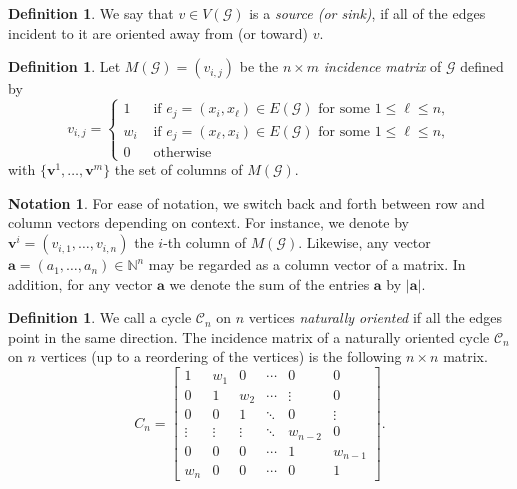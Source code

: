 \documentclass [12pt,a4paper,reqno]{amsart}
\theoremstyle{plain}
\theoremstyle{definition}
\newtheorem{Assumptions and Discussion}[Theorem]{Assumptions and Discussion}
\newtheorem{Definition}[Theorem]{Definition}
\newtheorem{Notation}[Theorem]{Notation}
\theoremstyle{remark}
\def\NN{{\mathbb N}}
\newcommand\bfa{\mathbf{a}}
\newcommand\bfv{\mathbf{v}}
\newcommand\calC{\mathcal{C}}
\newcommand\calG{\mathcal{G}}
\begin{document}
\begin{Definition}
We say that $v\in V(\calG)$ is a \emph{source (or sink)}, if all of the edges incident to it are oriented away from (or toward) $v$.  
\end{Definition}

\begin{Definition}
Let $M(\calG)=(v_{i,j})$ be the $n\times m$ \emph{incidence matrix} of $\calG$ defined by 
\[
    v_{i,j}=
    \begin{cases}
        1 & \text{ if $e_j=(x_i,x_\ell)\in E(\calG)$ for some $1\leq \ell\leq n$},\\
        w_i & \text{ if $e_j=(x_\ell,x_i)\in E(\calG)$ for some $1\leq \ell\leq n$},\\
        0 & \text{ otherwise}
    \end{cases}
\]
with $\{\bfv^1,\dots,\bfv^{m}\}$ the set of columns of $M(\calG)$.  
\end{Definition}

\begin{Notation}
For ease of notation, we switch back and forth between row and column vectors depending on context.
For instance, we denote by $\bfv^i = (v_{i,1}, \ldots, v_{i,n})$ the $i$-th column of $M(\calG)$. Likewise, any vector $\bfa = (a_1, \ldots, a_n) \in \NN^n$ may be regarded as a column vector of a matrix.  In addition, for any vector $\bfa$ we denote the sum of the entries $\bfa$ by $|\bfa|$.
\end{Notation}




\begin{Definition}\label{C_n}
    We call a cycle $\calC_n$ on $n$ vertices \emph{naturally oriented} if all the edges point in the same direction. The incidence matrix of a naturally oriented cycle $\calC_n$ on $n$ vertices (up to a reordering of the vertices) is the following $n\times n$ matrix. 
    \begin{equation}\label{Cn}
       C_n =\left[\begin{array}{cccccc}
 1&w_1 & 0 & \cdots & 0 &0\\
0& 1 & w_2 & \cdots & \vdots &0 \\
0& 0 & 1 & \ddots & 0 &\vdots \\
\vdots & \vdots & \vdots & \ddots &w_{n-2}&0 \\
0& 0 & 0  & \cdots & 1& w_{n-1}\\
w_n & 0 & 0 & \cdots &0& 1 
\end{array}\right].
    \end{equation}
\end{Definition}
\end{document}
